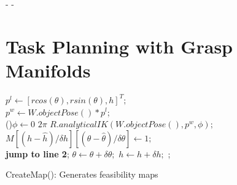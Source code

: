 \documentclass{aamas2015}
\begin{document}
%


\newpage
-
\newpage
-
\newpage
\section{Task Planning with Grasp Manifolds}

\begin{algorithm}[ht!]
   {
    \For{$\theta \leftarrow \hat{\theta}$ \KwTo $\check{\theta}$} {
      $p^l \leftarrow [r cos(\theta), r sin(\theta), h]^T;$ \\
      $p^w \leftarrow W.objectPose() * p^l$;  \\
      \For(){$\phi \leftarrow 0$ \KwTo $2 \pi$} {
	$R.analyticalIK(W.objectPose(), p^w, \phi);$ \\
	 {
	  $M[(h-\hat{h})/\delta h][(\theta-\hat{\theta})/\delta \theta] \leftarrow 1;$ \\
	  \textbf{jump to line 2};
	}
      }
      $\theta \leftarrow \theta + \delta \theta;$
    }
    $h \leftarrow h + \delta h;$
  }
  ; 
  \caption{CreateMap(): Generates feasibility maps}
\end{algorithm}
\end{document}

